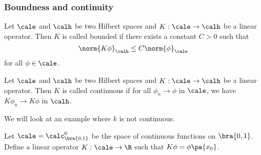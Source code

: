 \subsubsection{Boundness and continuity}
\begin{definition}[boundness]
    Let $\cale$ and $\calh$ be two Hilbert spaces and $K:\cale\rightarrow\calh$ be a linear operator. Then $K$ is called bounded if there exists a constant $C>0$ such that
    \begin{equation*}
        \norm{K\phi}_{\calh}\leq C\norm{\phi}_{\cale}
    \end{equation*}
    for all $\phi\in\cale$.
\end{definition}
\begin{definition}[continuity]
    Let $\cale$ and $\calh$ be two Hilbert spaces and $K:\cale\rightarrow\calh$ be a linear operator. Then $K$ is called continuous if for all $\phi_n\rightarrow\phi$ in $\cale$, we have $K\phi_n\rightarrow K\phi$ in $\calh$.
\end{definition}
We will look at an example where $k$ is not continuous.
\begin{example}
    Let $\cale=\calc_{\bra{0,1}}^0$ be the space of continuous functions on $\bra{0,1}$. Define a linear operator $K:\cale\rightarrow\R$ such that $K\phi=\phi\pa{x_0}$.
\end{example}

